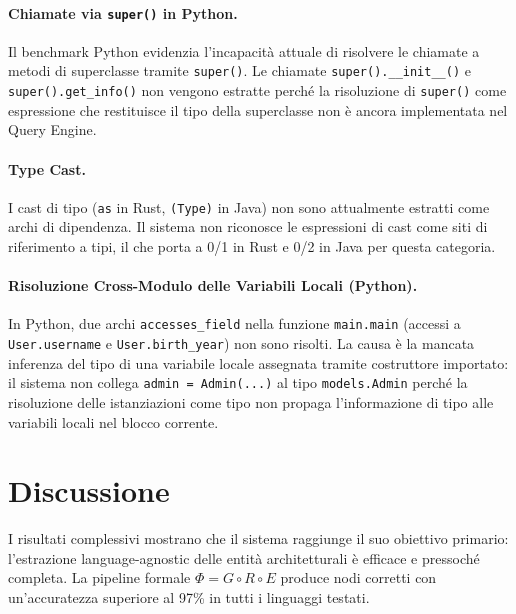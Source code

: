 \paragraph{Chiamate via \texttt{super()} in Python.}
Il benchmark Python evidenzia l'incapacità attuale di risolvere le
chiamate a metodi di superclasse tramite \texttt{super()}. Le chiamate
\texttt{super().\_\_init\_\_()} e \texttt{super().get\_info()} non
vengono estratte perché la risoluzione di \texttt{super()} come
espressione che restituisce il tipo della superclasse non è ancora
implementata nel Query Engine.

\paragraph{Type Cast.}
I cast di tipo (\texttt{as} in Rust, \texttt{(Type)} in Java) non
sono attualmente estratti come archi di dipendenza. Il sistema non
riconosce le espressioni di cast come siti di riferimento a tipi, il
che porta a 0/1 in Rust e 0/2 in Java per questa categoria.

\paragraph{Risoluzione Cross-Modulo delle Variabili Locali (Python).}
In Python, due archi \texttt{accesses\_field} nella funzione
\texttt{main.main} (accessi a \texttt{User.username} e
\texttt{User.birth\_year}) non sono risolti. La causa è la mancata
inferenza del tipo di una variabile locale assegnata tramite
costruttore importato: il sistema non collega
\texttt{admin = Admin(...)} al tipo \texttt{models.Admin} perché la
risoluzione delle istanziazioni come tipo non propaga l'informazione
di tipo alle variabili locali nel blocco corrente.

\section{Discussione}
I risultati complessivi mostrano che il sistema raggiunge il suo
obiettivo primario: l'estrazione language-agnostic delle entità
architetturali è efficace e pressoché completa. La pipeline formale
$\Phi = G \circ R \circ E$ produce nodi corretti con un'accuratezza
superiore al 97\% in tutti i linguaggi testati.

